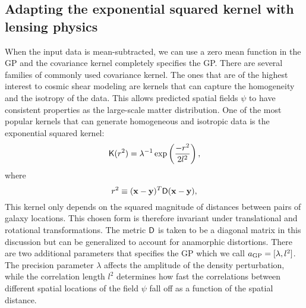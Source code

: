 
\subsection{Adapting the exponential squared kernel with lensing physics}
When the input data is mean-subtracted, we can use a zero mean function in the
GP and the covariance kernel completely specifies the GP. 
There are several families of commonly used covariance kernel.
The ones that are of the highest interest to cosmic shear modeling 
are kernels that can capture 
the homogeneity and the isotropy of the data. This allows predicted spatial fields
$\psi$ to have consistent properties as the large-scale matter distribution.
%
One of the most popular kernels that can generate homogeneous and
isotropic data is the exponential squared kernel: 
\begin{equation}
	\mathsf{K}(r^2) = \lambda^{-1} \exp\left(\frac{-r^2}{2 l^2}\right),
	\label{eq:exp_sq_kernel}
\end{equation}
where 
\begin{equation}
	r^2 \equiv (\mathbf{x} - \mathbf{y})^T \mathsf{D} (\mathbf{x} - \mathbf{y}), 
\end{equation}
This kernel only depends on the
squared magnitude of distances between pairs of galaxy locations. 
This chosen form is therefore invariant
under translational and rotational transformations.
The metric $\mathsf{D}$ is taken to be a diagonal matrix in this discussion but  
can be generalized to account for anamorphic distortions. There are two
additional parameters that specifies the GP which we call $a_{\rm GP} =
[\lambda, l^2]$.
The precision parameter $\lambda$ affects the 
amplitude of the density perturbation, while the correlation length $l^2$ 
determines how fast the correlations between different spatial locations of the
field $\psi$ fall off as a function of the spatial distance.

